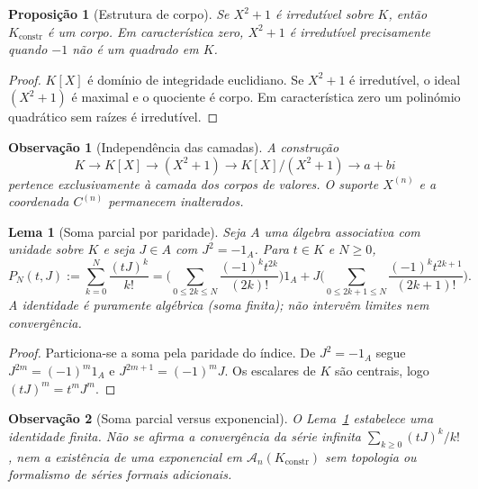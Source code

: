 \documentclass[11pt,a4paper]{article}
\newtheorem{proposicao}{Proposição}
\newtheorem{lema}{Lema}
\newtheorem{observacao}{Observação}
\begin{document}
\begin{proposicao}[Estrutura de corpo]
\label{prop:K-corpo}
Se \(X^2+1\) é irredutível sobre \(K\), então \(K_{\mathrm{constr}}\) é um
corpo.
Em característica zero, \(X^2+1\) é irredutível precisamente quando \(-1\)
não é um quadrado em \(K\).
\end{proposicao}

\begin{proof}
\(K[X]\) é domínio de integridade euclidiano.
Se \(X^2+1\) é irredutível, o ideal \((X^2+1)\) é maximal e o quociente é
corpo.
Em característica zero um polinómio quadrático sem raízes é irredutível.
\end{proof}

\begin{observacao}[Independência das camadas]
\label{obs:independencia-K}
A construção
\[
K\to K[X]\to(X^2+1)\to K[X]/(X^2+1)\to a+bi
\]
pertence exclusivamente à camada dos corpos de valores.
O suporte \(X^{(n)}\) e a coordenada \(C^{(n)}\) permanecem inalterados.
\end{observacao}

\begin{lema}[Soma parcial por paridade]
\label{lema:soma-parcial}
Seja \(A\) uma álgebra associativa com unidade sobre \(K\) e seja
\(J\in A\) com \(J^2=-1_A\).
Para \(t\in K\) e \(N\ge 0\),
\[
P_N(t,J)
:= \sum_{k=0}^{N}\frac{(tJ)^k}{k!}
= \Biggl(\sum_{0\le 2k\le N}\frac{(-1)^k t^{2k}}{(2k)!}\Biggr)1_A
+ J\Biggl(\sum_{0\le 2k+1\le N}\frac{(-1)^k t^{2k+1}}{(2k+1)!}\Biggr).
\]
A identidade é puramente algébrica (soma finita); não intervêm limites nem
convergência.
\end{lema}

\begin{proof}
Particiona-se a soma pela paridade do índice.
De \(J^2=-1_A\) segue \(J^{2m}=(-1)^m 1_A\) e \(J^{2m+1}=(-1)^m J\).
Os escalares de \(K\) são centrais, logo \((tJ)^m=t^m J^m\).
\end{proof}

\begin{observacao}[Soma parcial versus exponencial]
\label{obs:parcial-vs-exp}
O Lema~\ref{lema:soma-parcial} estabelece uma identidade finita.
Não se afirma a convergência da série infinita
\(\sum_{k\ge0}(tJ)^k/k!\), nem a existência de uma exponencial em
\(\mathcal A_n(K_{\mathrm{constr}})\) sem topologia ou formalismo de
séries formais adicionais.
\end{observacao}


\end{document}
